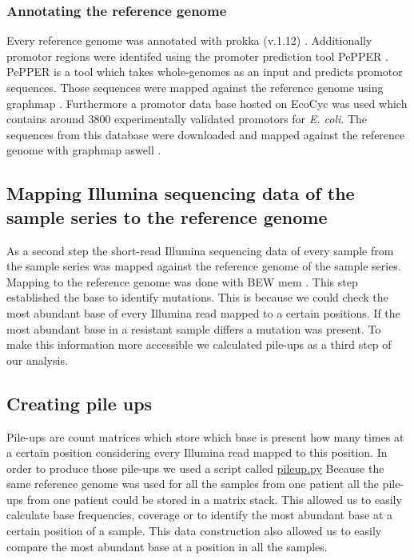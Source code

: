 \subsubsection{Annotating the reference genome}
Every reference genome was annotated with prokka (v.1.12) \cite{seemann_prokka:_2014}. Additionally promotor regions were identifed using the promoter prediction tool PePPER \cite{pepper}. PePPER is a tool which takes whole-genomes as an input and predicts promotor sequences. Those sequences were mapped against the reference genome using graphmap \cite{sovic_fast_2016}. Furthermore a promotor data base hosted on EcoCyc was used which contains around 3800 experimentally validated promotors for \textit{E. coli}\cite{noauthor_smarttable_nodate}. The sequences from this database were downloaded and mapped against the reference genome with graphmap aswell \cite{sovic_fast_2016}. 
\label{section:annotatiion_ref}

\subsection{Mapping Illumina sequencing data of the sample series to the reference genome}
As a second step the short-read Illumina sequencing data of every sample from the sample series was mapped against the reference genome of the sample series. Mapping to the reference genome was done with BEW mem \cite{li_fast_2009}. This step established the base to identify mutations. This is because we could check the most abundant base of every Illumina read mapped to a certain positions. If the most abundant base in a resistant sample differs a mutation was present. To make this information more accessible we calculated pile-ups as a third step of our analysis. 

\subsection{Creating pile ups}
Pile-ups are count matrices which store which base is present how many times at a certain position considering every Illumina read mapped to this position. In order to produce those pile-ups we used a script called \href{https://github.com/nahanoo/ESBL\_project/pileup.py}{pileup.py} Because the same reference genome was used for all the samples from one patient all the pile-ups from one patient could be stored in a matrix stack. This allowed us to easily calculate base frequencies, coverage or to identify the most abundant base at a certain position of a sample. This data construction also allowed us to easily compare the most abundant base at a position in all the samples.

